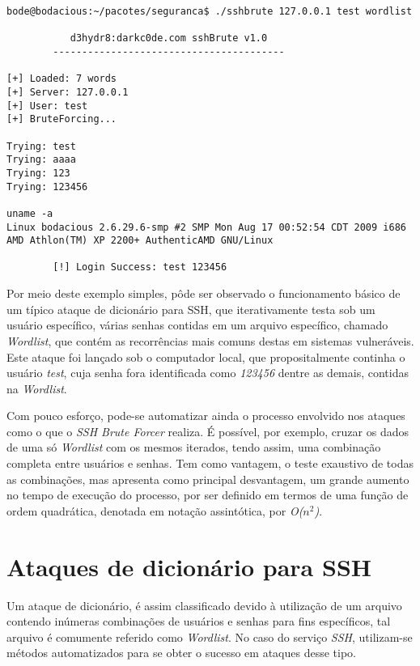 \begin{verbatim}
bode@bodacious:~/pacotes/seguranca$ ./sshbrute 127.0.0.1 test wordlist

           d3hydr8:darkc0de.com sshBrute v1.0
        ----------------------------------------

[+] Loaded: 7 words
[+] Server: 127.0.0.1
[+] User: test
[+] BruteForcing...

Trying: test
Trying: aaaa
Trying: 123
Trying: 123456

uname -a
Linux bodacious 2.6.29.6-smp #2 SMP Mon Aug 17 00:52:54 CDT 2009 i686
AMD Athlon(TM) XP 2200+ AuthenticAMD GNU/Linux

        [!] Login Success: test 123456
\end{verbatim}


Por meio deste exemplo simples, pôde ser observado o funcionamento básico de um típico ataque de dicionário para SSH, que iterativamente testa sob um usuário específico, várias senhas contidas em um arquivo específico, chamado \textit{Wordlist}, que contém as recorrências mais comuns destas em sistemas vulneráveis. Este ataque foi lançado sob o computador local, que propositalmente continha o usuário \textit{test}, cuja senha fora identificada como \textit{123456} dentre as demais, contidas na \textit{Wordlist}.

Com pouco esforço, pode-se automatizar ainda o processo envolvido nos ataques como o que o \textit{SSH Brute Forcer} realiza. É possível, por exemplo, cruzar os dados de uma só \textit{Wordlist} com os mesmos iterados, tendo assim, uma combinação completa entre usuários e senhas. Tem como vantagem, o teste exaustivo de todas as combinações, mas apresenta como principal desvantagem, um grande aumento no tempo de execução do processo, por ser definido em termos de uma função de ordem quadrática, denotada em notação assintótica, por \textit{O(\begin{math}n^2\end{math})}.

\section{Ataques de dicionário para SSH}

Um ataque de dicionário, é assim classificado devido à utilização de um arquivo contendo inúmeras combinações de usuários e senhas para fins específicos, tal arquivo é comumente referido como \textit{Wordlist}. No caso do serviço \textit{SSH}, utilizam-se métodos automatizados para se obter o sucesso em ataques desse tipo.

